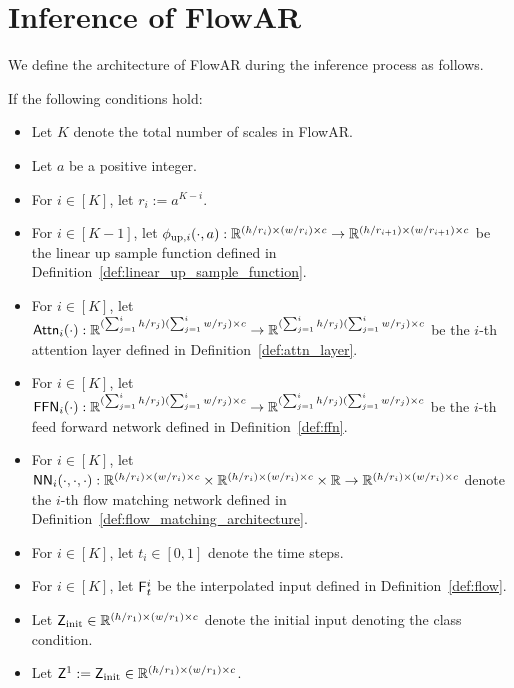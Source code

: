 \section{Inference of FlowAR}\label{sec:inference_of_flowar}
We define the architecture of FlowAR during the inference process as follows.
\begin{definition}\label{def:flow_architecture_inference}
    If the following conditions hold:
    \begin{itemize}
        \item Let $K$ denote the total number of scales in FlowAR.
        \item Let $a$ be a positive integer.
        \item For $i \in [K]$, let $r_i := a^{K-i}$.
        \item For $i \in [K-1]$, let $\phi_{\mathrm{up}, i}(\cdot, a):\mathbb{R}^{(h/r_i)\times(w/r_i)\times c} \to \mathbb{R}^{(h/r_{i+1})\times(w/r_{i+1})\times c}$ be the linear up sample function defined in Definition~\ref{def:linear_up_sample_function}.
        \item For $i \in [K]$, let $\mathsf{Attn}_i(\cdot):\mathbb{R}^{(\sum_{j=1}^i h/r_j)(\sum_{j=1}^i w/r_j) \times c} \to \mathbb{R}^{(\sum_{j=1}^i h/r_j)(\sum_{j=1}^i w/r_j) \times c}$ be the $i$-th attention layer defined in Definition~\ref{def:attn_layer}.
        \item For $i \in [K]$, let $\mathsf{FFN}_i(\cdot):\mathbb{R}^{(\sum_{j=1}^i h/r_j)(\sum_{j=1}^i w/r_j) \times c} \to \mathbb{R}^{(\sum_{j=1}^i h/r_j)(\sum_{j=1}^i w/r_j) \times c}$ be the $i$-th feed forward network defined in Definition~\ref{def:ffn}.
        \item For $i \in [K]$, let $\mathsf{NN}_i(\cdot,\cdot,\cdot):\mathbb{R}^{(h / r_i) \times (w/r_i) \times c} \times \mathbb{R}^{(h / r_i) \times (w/r_i) \times c} \times \mathbb{R} \to \mathbb{R}^{(h / r_i) \times (w/r_i) \times c}$ denote the $i$-th flow matching network defined in Definition~\ref{def:flow_matching_architecture}.
        \item For $i \in [K]$, let $t_i \in [0,1]$ denote the time steps.
        \item For $i \in [K]$, let $\mathsf{F}^i_t$ be the interpolated input defined in Definition~\ref{def:flow}.
        \item Let $\mathsf{Z}_{\mathrm{init}} \in \mathbb{R}^{(h/r_1) \times (w/r_1) \times c}$ denote the initial input denoting the class condition.
        \item Let $\mathsf{Z}^1:=\mathsf{Z}_{\mathrm{init}} \in \mathbb{R}^{(h/r_1)\times(w/r_1) \times c}$.
    \end{itemize}

\end{definition}
